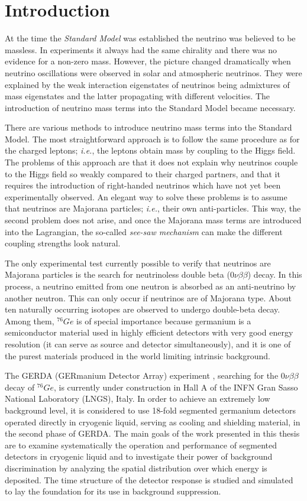 \chapter*{Introduction}
\label{cha:intro}
At the time the \emph{Standard Model} was established the neutrino was
believed to be massless. In experiments it always had the same
chirality and there was no evidence for a non-zero mass. However, the
picture changed dramatically when neutrino oscillations were observed
in solar and atmospheric neutrinos. They were explained by the weak
interaction eigenstates of neutrinos being admixtures of mass
eigenstates and the latter propagating with different velocities. The
introduction of neutrino mass terms into the Standard Model became
necessary.

There are various methods to introduce neutrino mass terms into the
Standard Model. The most straightforward approach is to follow the
same procedure as for the charged leptons; \textit{i.e.}, the leptons
obtain mass by coupling to the Higgs field. The problems of this
approach are that it does not explain why neutrinos couple to the
Higgs field so weakly compared to their charged partners, and that it
requires the introduction of right-handed neutrinos which have not yet
been experimentally observed. An elegant way to solve these problems
is to assume that neutrinos are Majorana particles; \textit{i.e.},
their own anti-particles. This way, the second problem does not arise,
and once the Majorana mass terms are introduced into the Lagrangian,
the so-called \emph{see-saw mechanism} can make the different coupling
strengths look natural.

The only experimental test currently possible to verify that neutrinos
are Majorana particles is the search for neutrinoless double beta
($0\nu\beta\beta$) decay. In this process, a neutrino emitted from one
neutron is absorbed as an anti-neutrino by another neutron. This can
only occur if neutrinos are of Majorana type. About ten naturally
occurring isotopes are observed to undergo double-beta decay. Among
them, $^{76}Ge$ is of special importance because germanium is a
semiconductor material used in highly efficient detectors with very
good energy resolution (it can serve as source and detector
simultaneously), and it is one of the purest materials produced in the
world limiting intrinsic background.

The GERDA (GERmanium Detector Array) experiment \cite{Abt04, Sch05},
searching for the $0\nu\beta\beta$ decay of $^{76}Ge$, is currently
under construction in Hall A of the INFN Gran Sasso National
Laboratory (LNGS), Italy. In order to achieve an extremely low
background level, it is considered to use 18-fold segmented germanium
detectors operated directly in cryogenic liquid, serving as cooling
and shielding material, in the second phase of GERDA. The main goals
of the work presented in this thesis are to examine systematically the
operation and performance of segmented detectors in cryogenic liquid
and to investigate their power of background discrimination by
analyzing the spatial distribution over which energy is deposited. The
time structure of the detector response is studied and simulated to
lay the foundation for its use in background suppression.

